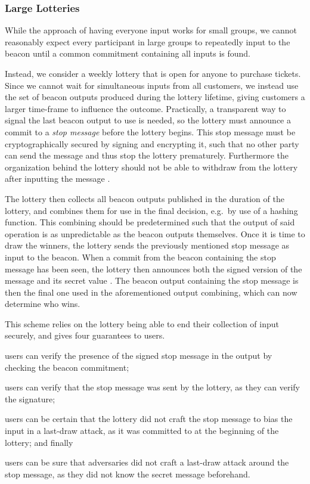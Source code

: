 \subsubsection{Large Lotteries}%
\label{ssub:large_lotteries}
While the approach of having everyone input works for small groups, we cannot reasonably expect every participant in large groups to repeatedly input to the beacon until a common commitment containing all inputs is found.

Instead, we consider a weekly lottery that is open for anyone to purchase tickets.
Since we cannot wait for simultaneous inputs from all customers, we instead use the set of beacon outputs produced during the lottery lifetime, giving customers a larger time-frame to influence the outcome.
Practically, a transparent way to signal the last beacon output to use is needed, so the lottery must announce a commit to a \textit{stop message} before the lottery begins.
This stop message must be cryptographically secured by signing and encrypting it, such that no other party can send the message and thus stop the lottery prematurely.
Furthermore the organization behind the lottery should not be able to withdraw from the lottery after inputting the message .

The lottery then collects all beacon outputs published in the duration of the lottery, and combines them for use in the final decision, e.g.\ by use of a hashing function.
This combining should be predetermined such that the output of said operation is as unpredictable as the beacon outputs themselves.
Once it is time to draw the winners, the lottery sends the previously mentioned stop message as input to the beacon.
When a commit from the beacon containing the stop message has been seen, the lottery then announces both the signed version of the message and its secret value .
The beacon output containing the stop message is then the final one used in the aforementioned output combining, which can now determine who wins.

This scheme relies on the lottery being able to end their collection of input securely, and gives four guarantees to users.
\begin{enumberate*}
\item users can verify the presence of the signed stop message in the output by checking the beacon commitment;
\item users can verify that the stop message was sent by the lottery, as they can verify the signature;
\item users can be certain that the lottery did not craft the stop message to bias the input in a last-draw attack, as it was committed to at the beginning of the lottery; and finally
\item users can be sure that adversaries did not craft a last-draw attack around the stop message, as they did not know the secret message beforehand.
\end{enumberate*}

